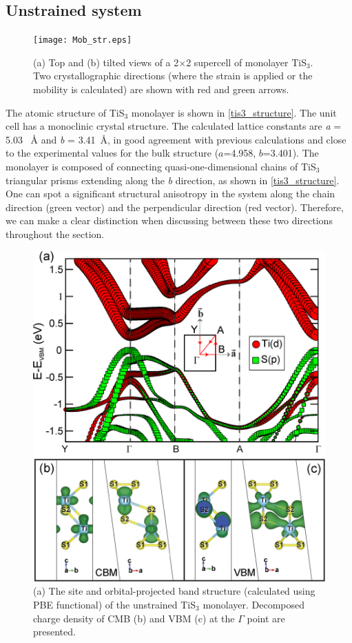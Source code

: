 \subsection{Unstrained system}

\begin{figure}[htb]
\centering
\texttt{[image: Mob\_str.eps]}
\caption{(a) Top and (b) tilted views of a 2$\times$2 supercell of monolayer TiS$_3$.  Two crystallographic directions (where the strain is applied or the mobility is calculated) are shown with red and green arrows. \label{tis3_structure} }
\end{figure}

The atomic structure of TiS$_3$ monolayer is shown in \autoref{tis3_structure}. The unit cell has a monoclinic crystal structure. The calculated lattice constants  are \textit{a} =  5.03 ~{\AA} and \textit{b} = 3.41~{\AA}, in good agreement with previous calculations \cite{Kang2015,Jin2015} and close to the experimental values for the bulk structure ($a$=4.958, $b$=3.401)\cite{Furuseth1975}. The monolayer is composed of connecting quasi-one-dimensional chains of TiS$_3$ triangular prisms extending along the \textit{b} direction, as shown in \autoref{tis3_structure}. One can spot a significant structural anisotropy in the system along the chain direction (green vector) and  the perpendicular direction (red vector). Therefore, we can make a clear distinction when discussing between these two directions throughout the section.

\begin{figure}[htb]
\centering
\includegraphics[width=0.8\linewidth]{Mob_projected_bands.eps}
\caption{(a) The site and orbital-projected band structure (calculated using PBE functional) of the unstrained TiS$_3$ monolayer.  Decomposed charge density of CMB (b) and  VBM (c) at the $\Gamma$ point are presented. \label{band} }
\end{figure}


